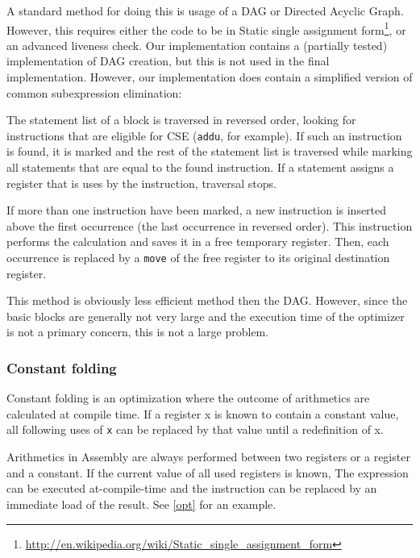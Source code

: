 \documentclass[10pt,a4paper]{article}
\begin{document}
A standard method for doing this is usage of a DAG or Directed Acyclic Graph.
However, this requires either the code to be in Static single
assignment
form\footnote{\url{http://en.wikipedia.org/wiki/Static\_single\_assignment\_form}},
or an advanced liveness check. Our implementation contains a (partially tested)
implementation of DAG creation, but this is not used in the final
implementation.  However, our implementation does contain a simplified version
of common subexpression elimination:

The statement list of a block is traversed in reversed order, looking for
instructions that are eligible for CSE (\texttt{addu}, for example). If such an
instruction is found, it is marked and the rest of the statement list is
traversed while marking all statements that are equal to the found instruction.
If a statement assigns a register that is uses by the instruction, traversal
stops.

If more than one instruction have been marked, a new instruction is inserted
above the first occurrence (the last occurrence in reversed order). This
instruction performs the calculation and saves it in a free temporary register.
Then, each occurrence is replaced by a \texttt{move} of the free register to
its original destination register.

This method is obviously less efficient method then the DAG.  However, since
the basic blocks are generally not very large and the execution time of the
optimizer is not a primary concern, this is not a large problem.

\subsubsection{Constant folding}

Constant folding is an optimization where the outcome of arithmetics are
calculated at compile time. If a register x is known to contain a constant
value, all following uses of \texttt{x} can be replaced by that value until a
redefinition of x.

Arithmetics in Assembly are always performed between two registers or a
register and a constant. If the current value of all used registers is known,
The expression can be executed at-compile-time and the instruction can be
replaced by an immediate load of the result. See \ref{opt} for an example.

\end{document}
